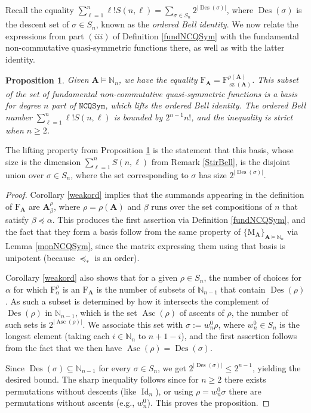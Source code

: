 \documentclass{article}
\newtheorem{prop}[thm]{Proposition}
\theoremstyle{definition}
\begin{document}
Recall the equality $\sum_{\ell=1}^{n}\ell!S(n,\ell)=\sum_{\sigma \in S_{n}}2^{|\operatorname{Des}(\sigma)|}$, where $\operatorname{Des}(\sigma)$ is the descent set of $\sigma \in S_{n}$, known as the \emph{ordered Bell identity}. We now relate the expressions from part $(iii)$ of Definition \ref{fundNCQSym} with the fundamental non-commutative quasi-symmetric functions there, as well as with the latter identity.
\begin{prop}
Given $\mathbf{A}\vDash\mathbb{N}_{n}$, we have the equality $\mathrm{F}_{\mathbf{A}}=\mathrm{F}_{\operatorname{sz}(\mathbf{A})}^{\rho(\mathbf{A})}$. This subset of the set of fundamental non-commutative quasi-symmetric functions is a basis for degree $n$ part of $\mathtt{NCQSym}$, which lifts the ordered Bell identity. The ordered Bell number $\sum_{\ell=1}^{n}\ell!S(n,\ell)$ is bounded by $2^{n-1}n!$, and the inequality is strict when $n\geq2$. \label{basdim}
\end{prop}
The lifting property from Proposition \ref{basdim} is the statement that this basis, whose size is the dimension $\sum_{\ell=1}^{n}S(n,\ell)$ from Remark \ref{StirBell}, is the disjoint union over $\sigma \in S_{n}$, where the set corresponding to $\sigma$ has size $2^{|\operatorname{Des}(\sigma)|}$.
\begin{proof}
Corollary \ref{weakord} implies that the summands appearing in the definition of $\mathrm{F}_{\mathbf{A}}$ are $\mathbf{A}_{\beta}^{\rho}$, where $\rho=\rho(\mathbf{A})$ and $\beta$ runs over the set compositions of $n$ that satisfy $\beta\preceq\alpha$. This produces the first assertion via Definition \ref{fundNCQSym}, and the fact that they form a basis follow from the same property of $\{\mathrm{M}_{\mathbf{A}}\}_{\mathbf{A}\vDash\mathbb{N}_{n}}$ via Lemma \ref{monNCQSym}, since the matrix expressing them using that basis is unipotent (because $\preceq_{*}$ is an order).

Corollary \ref{weakord} also shows that for a given $\rho \in S_{n}$, the number of choices for $\alpha$ for which $\mathrm{F}_{\alpha}^{\rho}$ is an $\mathrm{F}_{\mathbf{A}}$ is the number of subsets of $\mathbb{N}_{n-1}$ that contain $\operatorname{Des}(\rho)$. As such a subset is determined by how it intersects the complement of $\operatorname{Des}(\rho)$ in $\mathbb{N}_{n-1}$, which is the set $\operatorname{Asc}(\rho)$ of ascents of $\rho$, the number of such sets is $2^{|\operatorname{Asc}(\rho)|}$. We associate this set with $\sigma:=w^{0}_{n}\rho$, where $w^{0}_{n} \in S_{n}$ is the longest element (taking each $i\in\mathbb{N}_{n}$ to $n+1-i$), and the first assertion follows from the fact that we then have $\operatorname{Asc}(\rho)=\operatorname{Des}(\sigma)$.

Since $\operatorname{Des}(\sigma)\subseteq\mathbb{N}_{n-1}$ for every $\sigma \in S_{n}$, we get $2^{|\operatorname{Des}(\sigma)|}\leq2^{n-1}$, yielding the desired bound. The sharp inequality follows since for $n\geq2$ there exists permutations without descents (like $\operatorname{Id}_{n}$), or using $\rho=w^{0}_{n}\sigma$ there are permutations without ascents (e.g., $w^{0}_{n}$). This proves the proposition.
\end{proof}
\end{document}
